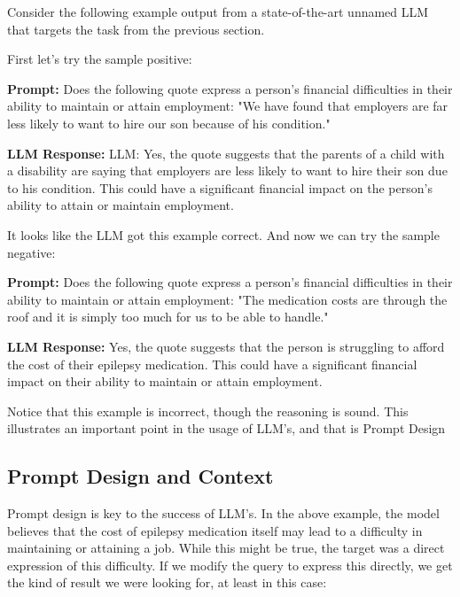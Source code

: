 Consider the following example output from a state-of-the-art unnamed LLM that targets the task from the previous section.

First let's try the sample positive:

\begin{displayquote}
  \textbf{Prompt:} Does the following quote express a person's financial difficulties in their ability to maintain or attain employment: "We have found that employers are far less likely to want to hire our son because of his condition."
\end{displayquote}

\begin{displayquote}
  \textbf{LLM Response:} LLM: Yes, the quote suggests that the parents of a child with a disability are saying that employers are less likely to want to hire their son due to his condition. This could have a significant financial impact on the person's ability to attain or maintain employment.
\end{displayquote}

It looks like the LLM got this example correct. And now we can try the sample negative:

\begin{displayquote}
  \textbf{Prompt:} Does the following quote express a person's financial difficulties in their ability to maintain or attain employment: "The medication costs are through the roof and it is simply too much for us to be able to handle."
\end{displayquote}

\begin{displayquote}
  \textbf{LLM Response:} Yes, the quote suggests that the person is struggling to afford the cost of their epilepsy medication. This could have a significant financial impact on their ability to maintain or attain employment.
\end{displayquote}

Notice that this example is incorrect, though the reasoning is sound. This illustrates an important point in the usage of LLM's, and that is Prompt Design

\subsection{Prompt Design and Context}

Prompt design is key to the success of LLM's. In the above example, the model believes that the cost of epilepsy medication itself may lead to a difficulty in maintaining or attaining a job. While this might be true, the target was a direct expression of this difficulty.
If we modify the query to express this directly, we get the kind of result we were looking for, at least in this case:


